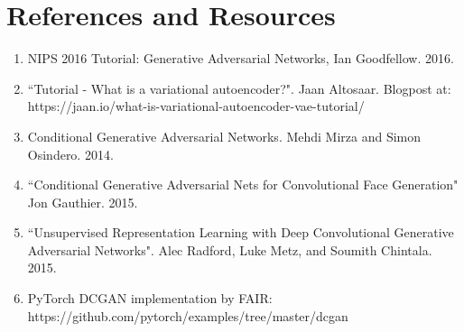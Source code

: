 \documentclass[a4paper]{article}
\begin{document}
\section*{References and Resources}
\begin{enumerate}
\item{NIPS 2016 Tutorial: Generative Adversarial Networks, Ian Goodfellow. 2016. }
\item{``Tutorial - What is a variational autoencoder?". Jaan Altosaar. Blogpost at: https://jaan.io/what-is-variational-autoencoder-vae-tutorial/}
\item{Conditional Generative Adversarial Networks. Mehdi Mirza and Simon Osindero. 2014. }
\item{``Conditional Generative Adversarial Nets for Convolutional Face Generation" Jon Gauthier. 2015. }
\item{``Unsupervised Representation Learning with Deep Convolutional Generative Adversarial Networks". Alec Radford, Luke Metz, and Soumith Chintala. 2015. }
\item{PyTorch DCGAN implementation by FAIR: https://github.com/pytorch/examples/tree/master/dcgan}
\end{enumerate}
\end{document}

